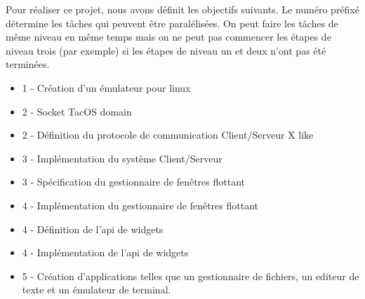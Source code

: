 Pour réaliser ce projet, nous avons définit les objectifs suivants. Le numéro préfixé détermine les tâches qui peuvent être paralélisées. On peut faire les tâches de même niveau en même temps mais on ne peut pas commencer les étapes de niveau trois (par exemple) si les étapes de niveau un et deux n'ont pas été terminées.

\begin{itemize}
\renewcommand{\labelitemi}{$\bullet$}
\item 1 - Création d'un émulateur pour linux
\item 2 - Socket TacOS domain
\item 2 - Définition du protocole de communication Client/Serveur X like
\item 3 - Implémentation du système Client/Serveur
\item 3 - Spécification du gestionnaire de fenêtres flottant
\item 4 - Implémentation du gestionnaire de fenêtres flottant
\item 4 - Définition de l'api de widgets
\item 4 - Implémentation de l'api de widgets
\item 5 - Création d'applications telles que un gestionnaire de fichiers, un editeur de texte et un émulateur de terminal.
\end{itemize}
